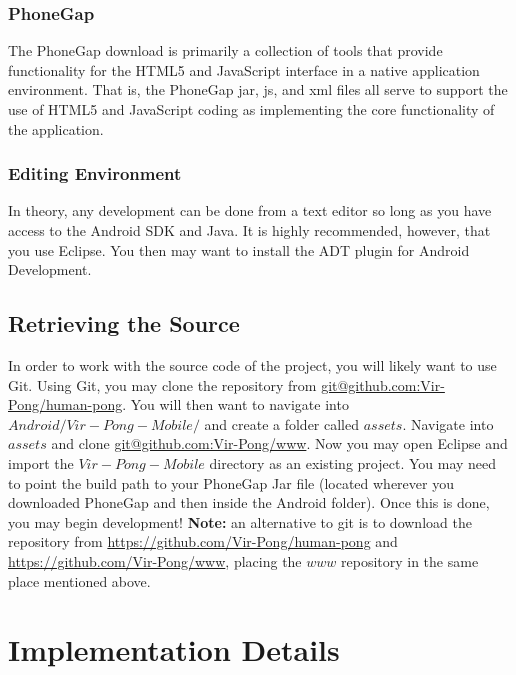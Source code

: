\documentclass[12pt]{article}
\begin{document}
\subsubsection{PhoneGap}
The PhoneGap download is primarily a collection of tools that provide functionality for the HTML5 and JavaScript interface in a native application environment.  That is, the PhoneGap jar, js, and xml files all serve to support the use of HTML5 and JavaScript coding as implementing the core functionality of the application.   

\subsubsection{Editing Environment}
In theory, any development can be done from a text editor so long as you have access to the Android SDK and Java.  It is highly recommended, however, that you use Eclipse\cite{Eclipse-Helios}.  You then may want to install the ADT plugin for Android Development\cite{Eclipse-ADT}.

\subsection{Retrieving the Source}
In order to work with the source code of the project, you will likely want to use Git\cite{Github}.  Using Git, you may clone the repository from \url{git@github.com:Vir-Pong/human-pong}.  You will then want to navigate into $Android/Vir-Pong-Mobile/$ and create a folder called $assets$.  Navigate into $assets$ and clone \url{git@github.com:Vir-Pong/www}.  Now you may open Eclipse and import the $Vir-Pong-Mobile$ directory as an existing project.  You may need to point the build path to your PhoneGap Jar file (located wherever you downloaded PhoneGap and then inside the Android folder).  Once this is done, you may begin development!  \textbf{Note:} an alternative to git is to download the repository from \url{https://github.com/Vir-Pong/human-pong} and \url{https://github.com/Vir-Pong/www}, placing the $www$ repository in the same place mentioned above.



\section{Implementation Details}
\end{document}

